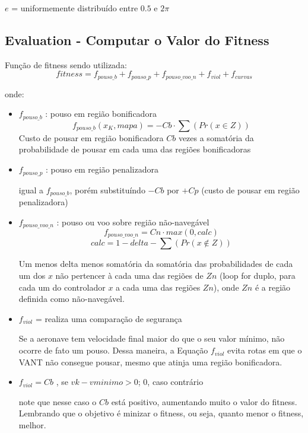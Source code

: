\documentclass{article}
\begin{document}
\(e\) = uniformemente distribuído entre \(0.5\) e \(2\pi\)

\subsection{Evaluation - Computar o Valor do Fitness}
Função de fitness sendo utilizada:
\[fitness = f_{pouso\_b} + f_{pouso\_p} + f_{pouso\_voo\_n} + f_{viol} + f_{curvas}\]

onde:

\begin{itemize}
	\item \(f_{pouso\_b}\) : pouso em região bonificadora
	\[f_{pouso\_b}(x_K, mapa) = - Cb \cdot \sum(Pr(x \in Z) )\]
	Custo de pousar em região bonificadora \(Cb\) vezes a somatória da probabilidade de pousar em cada uma das regiões bonificadoras
	
	\item \(f_{pouso\_p}\) : pouso em região penalizadora
	
	igual a \(f_{pouso\_b}\), porém substituíndo \(-Cb\) por \(+Cp\) (custo de pousar em região penalizadora)
	
	\item \(f_{pouso\_voo\_n}\) : pouso ou voo sobre região não-navegável
	\[f_{pouso\_voo\_n} = Cn \cdot max(0 , calc)\]
	\[calc = 1 - delta - \sum(Pr(x \notin Z))\]
	
	Um menos delta menos somatória da somatória das probabilidades de cada um dos \(x\) não pertencer à cada uma das regiões de \(Zn\)  (loop for duplo, para cada um do controlador \(x\) a cada uma das regiões \(Zn\)), onde \(Zn\) é a região definida como não-navegável.
	
	\item \(f_{viol}\) = realiza uma comparação de segurança
	
	Se a aeronave tem velocidade final maior do que o seu valor mínimo, não ocorre de fato um pouso. Dessa maneira, a Equação \(f_{viol}\) evita rotas em que o VANT não consegue pousar, mesmo que atinja uma região bonificadora.
	
	\item \(f_{viol}=Cb\) , se \(vk - vminimo > 0\); 
	\(0\), caso contrário
	
	note que nesse caso o \(Cb\) está positivo, aumentando muito o valor do fitness. Lembrando que o objetivo é minizar o fitness, ou seja, quanto menor o fitness, melhor.
	

\end{itemize}
\end{document}
